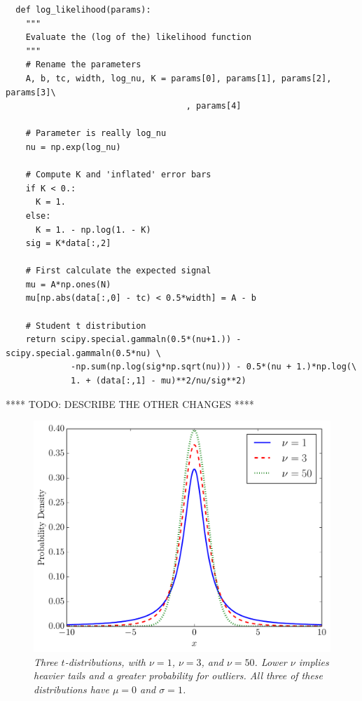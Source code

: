 \begin{verbatim}
  def log_likelihood(params):
    """
    Evaluate the (log of the) likelihood function
    """
    # Rename the parameters
    A, b, tc, width, log_nu, K = params[0], params[1], params[2], params[3]\
                                    , params[4]

    # Parameter is really log_nu
    nu = np.exp(log_nu)

    # Compute K and 'inflated' error bars
    if K < 0.:
      K = 1.
    else:
      K = 1. - np.log(1. - K)
    sig = K*data[:,2]

    # First calculate the expected signal
    mu = A*np.ones(N)
    mu[np.abs(data[:,0] - tc) < 0.5*width] = A - b

    # Student t distribution
    return scipy.special.gammaln(0.5*(nu+1.)) - scipy.special.gammaln(0.5*nu) \
             -np.sum(np.log(sig*np.sqrt(nu))) - 0.5*(nu + 1.)*np.log(\
             1. + (data[:,1] - mu)**2/nu/sig**2)
\end{verbatim}

**** TODO: DESCRIBE THE OTHER CHANGES ****


\begin{figure}
\begin{center}
\includegraphics[scale=0.45]{tdist.pdf}
\caption{\it Three $t$-distributions, with $\nu=1$, $\nu=3$, and $\nu=50$. Lower
$\nu$ implies heavier tails and a greater probability for outliers. All three
of these distributions have $\mu=0$ and $\sigma=1$.
\label{fig:tdist}}
\end{center}
\end{figure}

